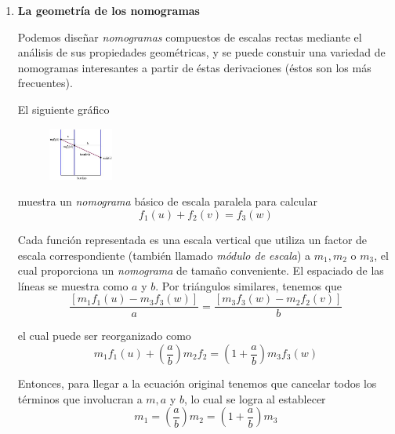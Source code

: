 \documentclass[letterpaper,11pt]{article}
\begin{document}
\begin{enumerate}
    \item \textbf{La geometría de los nomogramas}
    
    Podemos diseñar \textit{nomogramas} compuestos de escalas rectas mediante 
    el análisis de sus propiedades geométricas, y se puede constuir una variedad 
    de nomogramas interesantes a partir de éstas derivaciones (éstos son los 
    más frecuentes). 

    El siguiente gráfico 
    \begin{figure}[htb]
        \centering
        \includegraphics[width=0.2\textwidth]{./imagenes/geometry1.jpg}
    \end{figure} 

    muestra un \textit{nomograma} básico de escala paralela para calcular 
    \begin{equation*}
        f_{1} (u) + f_{2} (v) = f_{3} (w)
    \end{equation*}

    Cada función representada es una escala vertical que utiliza un factor de 
    escala correspondiente (también llamado \textit{módulo de escala}) a 
    $m_{1}, m_{2}$ o $m_{3}$, el cual proporciona un \textit{nomograma} de 
    tamaño conveniente. El espaciado de las líneas se muestra como $a$ y $b$. 
    Por triángulos similares, tenemos que 
    \begin{equation*}
        \frac{[m_{1} f_{1} (u) - m_{3} f_{3} (w)]}{a} = 
        \frac{[m_{3} f_{3} (w) - m_{2} f_{2} (v)]}{b}
    \end{equation*}

    el cual puede ser reorganizado como 
    \begin{equation*}
        m_{1} f_{1} (u) + (\frac{a}{b}) m_{2} f_{2} =
        (1 + \frac{a}{b}) m_{3} f_{3} (w)
    \end{equation*}

    Entonces, para llegar a la ecuación original tenemos que cancelar todos los 
    términos que involucran a $m, a$ y $b$, lo cual se logra al establecer
    \begin{equation*}
        m_{1} = (\frac{a}{b}) m_{2} = (1 + \frac{a}{b}) m_{3}
    \end{equation*}


\end{enumerate}
\end{document}
